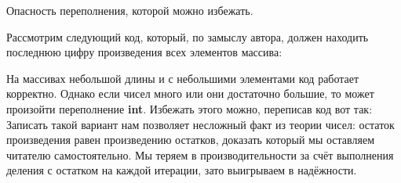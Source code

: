 \begin{typerror}
	\label{TE_avoidable-overflow}
	Опасность переполнения, которой можно избежать.

	Рассмотрим следующий код, который, по замыслу автора, должен находить последнюю цифру произведения всех элементов массива:

	На массивах небольшой длины и с небольшими элементами код работает корректно.
	Однако если чисел много или они достаточно большие, то может произойти переполнение \textbf{int}.
	Избежать этого можно, переписав код вот так:
	Записать такой вариант нам позволяет несложный факт из теории чисел: остаток произведения равен произведению остатков, доказать который мы оставляем читателю самостоятельно.
	Мы теряем в производительности за счёт выполнения деления с остатком на каждой итерации, зато выигрываем в надёжности.
\end  {typerror}
